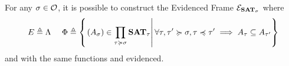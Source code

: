 \documentclass[a4paper,UKenglish,cleveref, autoref, thm-restate]{lipics-v2021}
\begin{document}

\begin{remark}\label{rmk:EFSigma}
  For any $\sigma \in \mathcal O$, it is possible to construct the Evidenced Frame $\mathcal{E}_{{\mathbf{SAT}}_{\sigma}}$ where
  \[E \triangleq \Lambda \quad~ \Phi \triangleq \left\{\left.(A_\sigma)\in\prod_{\tau \succcurlyeq \sigma} {\mathbf{SAT}}_{\tau}\right\vert \forall \tau, \tau'\succcurlyeq \sigma, \tau \preccurlyeq \tau' \implies A_{\tau} \subseteq A_{\tau'} \right\}\]
  and with the same functions and evidenced.
\end{remark}

\end{document}
